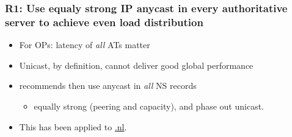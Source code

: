 \documentclass[11pt,show 
notes,notheorems,noamsthm,blank]{beamer} %
\begin{document}
\begin{frame}
 \frametitle{R1: Use equaly strong IP anycast in every authoritative server to
    achieve even load distribution}
    
    
    
\begin{figure}
\centering

  
  \label{fig:nl-deployment}

\end{figure}
\vspace{-0.5cm}
\begin{itemize}
 \item For OPs: latency of \textit{all} ATs matter
  \item Unicast, by definition, cannot deliver good global performance 
  \item \cite{Mueller17b} recommends then use anycast in \textit{all} NS 
records
\begin{itemize}
 \item equally strong (peering and capacity), and phase out unicast.
\end{itemize}


\item This has been applied to \url{.nl}.
\end{itemize}


\end{frame}
\end{document}
